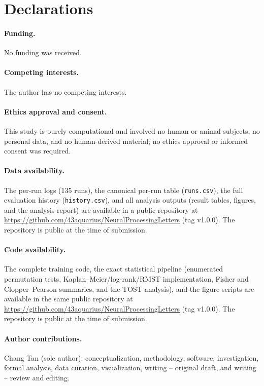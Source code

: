 \documentclass[10pt]{article}
\begin{document}
\section*{Declarations}

\paragraph{Funding.} No funding was received.

\paragraph{Competing interests.} The author has no competing interests.

\paragraph{Ethics approval and consent.} This study is purely computational and involved no human or animal subjects, no personal data, and no human-derived material; no ethics approval or informed consent was required.

\paragraph{Data availability.} The per-run logs (135 runs), the canonical per-run table (\texttt{runs.csv}), the full evaluation history (\texttt{history.csv}), and all analysis outputs (result tables, figures, and the analysis report) are available in a public repository at \url{https://github.com/43aquarius/NeuralProcessingLetters} (tag v1.0.0). The repository is public at the time of submission.

\paragraph{Code availability.} The complete training code, the exact statistical pipeline (enumerated permutation tests, Kaplan--Meier/log-rank/RMST implementation, Fisher and Clopper--Pearson summaries, and the TOST analysis), and the figure scripts are available in the same public repository at \url{https://github.com/43aquarius/NeuralProcessingLetters} (tag v1.0.0). The repository is public at the time of submission.

\paragraph{Author contributions.} Chang Tan (sole author): conceptualization, methodology, software, investigation, formal analysis, data curation, visualization, writing -- original draft, and writing -- review and editing.
\end{document}
